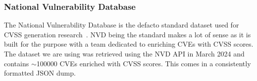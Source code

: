\subsubsection{National Vulnerability Database} \label{NVD_SECTION}

The National Vulnerability Database is the defacto standard dataset used for CVSS generation research~\cite{costa, nvd_example1, nvd_example2}.  NVD being the standard makes a lot of sense as it is built for the purpose with a team dedicated to enriching CVEs with CVSS scores. The dataset we are using was retrieved using the NVD API in March 2024 and contains $\sim$100000 CVEs enriched with CVSS scores. This comes in a consistently formatted JSON dump.







